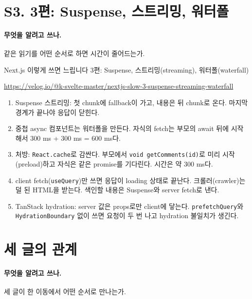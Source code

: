 \section{S3. 3편: Suspense, 스트리밍, 워터폴}\label{sec:src-s3}

\paragraph{무엇을 알려고 쓰나.}
같은 읽기를 어떤 순서로 하면 시간이 줄어드는가.

\begin{description}[font=\bfseries\small, leftmargin=3.4em, labelwidth=3em, itemsep=1pt]
  \item[제목] Next.js 이렇게 쓰면 느립니다 3편: Suspense, 스트리밍(streaming), 워터폴(waterfall)
  \item[URL] {\footnotesize\url{https://velog.io/@k-svelte-master/nextjs-slow-3-suspense-streaming-waterfall}}
\end{description}

\begin{enumerate}[nosep]
  \item Suspense 스트리밍: 첫 chunk에 fallback이 가고, 내용은 뒤 chunk로 온다. 마지막 경계가 끝나야 응답이 닫힌다.
  \item 중첩 async 컴포넌트는 워터폴을 만든다. 자식의 fetch는 부모의 await 뒤에 시작해서 300 ms + 300 ms = 600 ms다.
  \item 처방: \texttt{React.cache}로 감싼다. 부모에서 \texttt{void getComments(id)}로 미리 시작(preload)하고 자식은 같은 promise를 기다린다. 시간은 약 300 ms다.
  \item client fetch(\texttt{useQuery})만 쓰면 응답이 loading 상태로 끝난다. 크롤러(crawler)는 덜 된 HTML을 받는다. 색인할 내용은 Suspense와 server fetch로 낸다.
  \item TanStack hydration: server 값은 props로만 client에 닿는다. \texttt{prefetchQuery}와 \texttt{HydrationBoundary} 없이 쓰면 요청이 두 번 나고 hydration 불일치가 생긴다.
\end{enumerate}

\section{세 글의 관계}\label{sec:src-chain}

\paragraph{무엇을 알려고 쓰나.}
세 글이 한 이동에서 어떤 순서로 만나는가.

